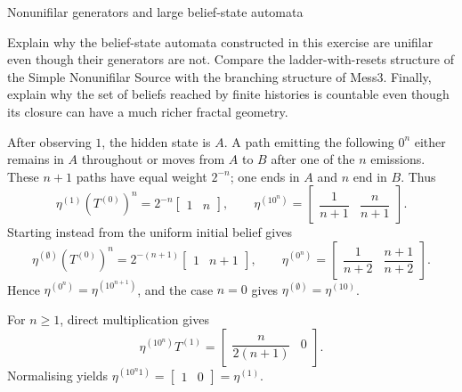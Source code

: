{\begin{exercise}[Extension]{Nonunifilar generators and large belief-state automata}
\begin{parts}
\begin{subparts}
        \item Explain why the belief-state automata constructed in this
          exercise are unifilar even though their generators are not. Compare
          the ladder-with-resets structure of the Simple Nonunifilar Source
          with the branching structure of Mess3. Finally, explain why the set
          of beliefs reached by finite histories is countable even though its
          closure can have a much richer fractal geometry.
      \end{subparts}
  \end{parts}

  \begin{solution}
    \begin{parts}
      \item
        \begin{subparts}
          \item After observing $1$, the hidden state is $A$. A path emitting
            the following $0^n$ either remains in $A$ throughout or moves from
            $A$ to $B$ after one of the $n$ emissions. These $n+1$ paths have
            equal weight $2^{-n}$; one ends in $A$ and $n$ end in $B$. Thus
            \[
              \eta^{(1)}(T^{(0)})^n
                =2^{-n}\begin{bmatrix}1&n\end{bmatrix},
              \qquad
              \eta^{(10^n)}=
                \begin{bmatrix}\dfrac1{n+1}&\dfrac n{n+1}\end{bmatrix}.
            \]
            Starting instead from the uniform initial belief gives
            \[
              \eta^{(\emptyset)}(T^{(0)})^n
                =2^{-(n+1)}\begin{bmatrix}1&n+1\end{bmatrix},
              \qquad
              \eta^{(0^n)}=
                \begin{bmatrix}\dfrac1{n+2}&\dfrac{n+1}{n+2}\end{bmatrix}.
            \]
            Hence $\eta^{(0^n)}=\eta^{(10^{n+1})}$, and the case $n=0$
            gives $\eta^{(\emptyset)}=\eta^{(10)}$.

          \item For $n\geq1$, direct multiplication gives
            \[
              \eta^{(10^n)}T^{(1)}
                =\begin{bmatrix}\dfrac n{2(n+1)}&0\end{bmatrix}.
            \]
            Normalising yields
            $\eta^{(10^n1)}=\begin{bmatrix}1&0\end{bmatrix}=\eta^{(1)}$.


\end{subparts}
\end{parts}
\end{solution}
\end{exercise}}
